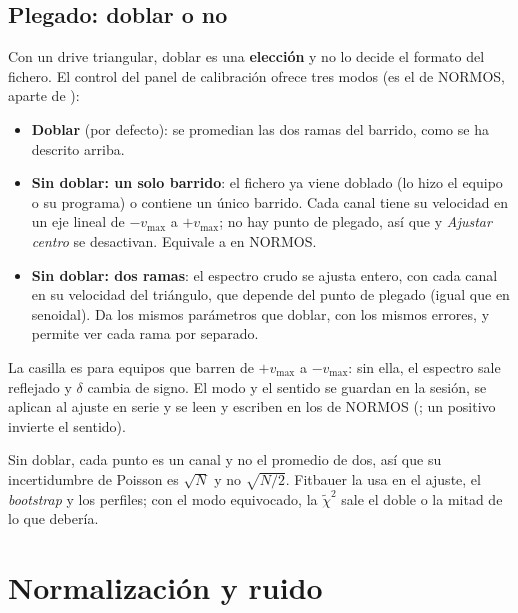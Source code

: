\subsection{Plegado: doblar o no}
\label{sec:fold-mode}

Con un drive triangular, doblar es una \textbf{elección} y no lo decide el
formato del fichero. El control  del panel de calibración ofrece
tres modos (es el  de NORMOS, aparte de ):

\begin{itemize}[nosep]
  \item \textbf{Doblar} (por defecto): se promedian las dos ramas del barrido,
        como se ha descrito arriba.
  \item \textbf{Sin doblar: un solo barrido}: el fichero ya viene doblado (lo hizo
        el equipo o su programa) o contiene un único barrido. Cada canal tiene su
        velocidad en un eje lineal de $-v_{\max}$ a $+v_{\max}$; no hay punto de
        plegado, así que  y \emph{Ajustar centro} se desactivan.
        Equivale a  en NORMOS.
  \item \textbf{Sin doblar: dos ramas}: el espectro crudo se ajusta entero, con
        cada canal en su velocidad del triángulo, que depende del punto de
        plegado (igual que en senoidal). Da los mismos parámetros que doblar, con
        los mismos errores, y permite ver cada rama por separado.
\end{itemize}

La casilla  es para equipos que barren de $+v_{\max}$ a
$-v_{\max}$: sin ella, el espectro sale reflejado y $\delta$ cambia de signo.
El modo y el sentido se guardan en la sesión, se aplican al ajuste en serie y se
leen y escriben en los  de NORMOS (; un 
positivo invierte el sentido).

\begin{nota}
Sin doblar, cada punto es un canal y no el promedio de dos, así que su
incertidumbre de Poisson es $\sqrt{N}$ y no $\sqrt{N/2}$. Fitbauer la usa en el
ajuste, el \emph{bootstrap} y los perfiles; con el modo equivocado, la
$\tilde{\chi}^2$ sale el doble o la mitad de lo que debería.
\end{nota}

\section{Normalización y ruido}

